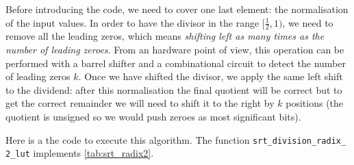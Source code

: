 Before introducing the code, we need to cover one last element: the normalisation of the input values. 
In order to have the divisor in the range $[\frac{1}{2}, 1)$, we need to remove all the leading zeros, which means \textit{shifting left as many times as the number of leading zeroes}. 
From an hardware point of view, this operation can be performed with a barrel shifter and a combinational circuit to detect the number of leading zeros $k$. 
Once we have shifted the divisor, we apply the same left shift to the dividend: after this normalisation the final quotient will be correct but to get the correct remainder we will need to shift it to the right by $k$ positions (the quotient is unsigned so we would push zeroes as most significant bits). 

Here is a the code to execute this algorithm.
The function \texttt{srt\_division\_radix\_
2\_lut} implements \autoref{tab:srt_radix2}. 

